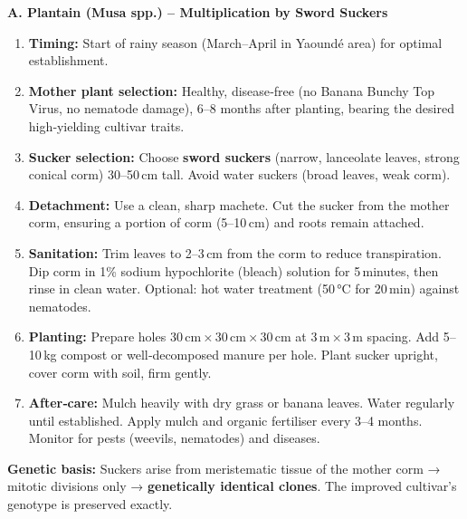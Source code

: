 \documentclass[11pt]{article}
\newcommand{\cle}[1]{{\popxbold\color{popdark}#1}}
\begin{document}
\begin{exemplebox}
\textbf{A. Plantain (Musa spp.) – Multiplication by Sword Suckers}
\begin{methode}
\begin{enumerate}
\item \textbf{Timing:} Start of rainy season (March–April in Yaoundé area) for optimal establishment.
\item \textbf{Mother plant selection:} Healthy, disease‑free (no Banana Bunchy Top Virus, no nematode damage), 6–8 months after planting, bearing the desired high‑yielding cultivar traits.
\item \textbf{Sucker selection:} Choose \textbf{sword suckers} (narrow, lanceolate leaves, strong conical corm) 30–50 cm tall. Avoid water suckers (broad leaves, weak corm).
\item \textbf{Detachment:} Use a clean, sharp machete. Cut the sucker from the mother corm, ensuring a portion of corm (5–10 cm) and roots remain attached.
\item \textbf{Sanitation:} Trim leaves to 2–3 cm from the corm to reduce transpiration. Dip corm in 1\% sodium hypochlorite (bleach) solution for 5 minutes, then rinse in clean water. Optional: hot water treatment (50 °C for 20 min) against nematodes.
\item \textbf{Planting:} Prepare holes 30 cm × 30 cm × 30 cm at 3 m × 3 m spacing. Add 5–10 kg compost or well‑decomposed manure per hole. Plant sucker upright, cover corm with soil, firm gently.
\item \textbf{After‑care:} Mulch heavily with dry grass or banana leaves. Water regularly until established. Apply mulch and organic fertiliser every 3–4 months. Monitor for pests (weevils, nematodes) and diseases.
\end{enumerate}
\end{methode}
\textbf{Genetic basis:} Suckers arise from meristematic tissue of the mother corm → \cle{mitotic divisions} only → \textbf{genetically identical clones}. The improved cultivar’s genotype is preserved exactly.


\end{exemplebox}
\end{document}
